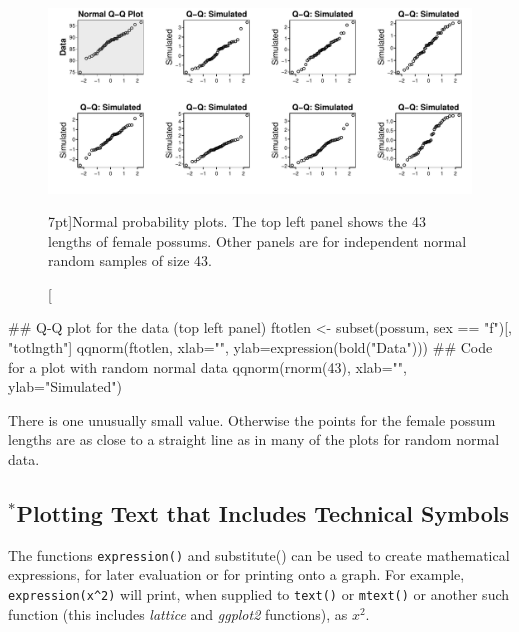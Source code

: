 \documentclass{tufte-book}\usepackage[]{graphicx}\usepackage[]{color}
\newcommand{\txtt}[1]{\texttt{#1}}
\begin{document}
\begin{figure}
\begin{Schunk}


\centerline{\includegraphics[width=\textwidth]{figs/07-possum-qqn-1} }

\end{Schunk}
 \caption[][7pt]{Normal probability plots. The top left panel
   shows the 43 lengths
of female possums. Other panels are for independent normal
random samples of size 43.\label{fig:np-plots}}
\vspace*{-24pt}

\end{figure}

\begin{Schunk}
\begin{Sinput}
## Q-Q plot for the data (top left panel)
ftotlen <- subset(possum, sex == "f")[, "totlngth"]
qqnorm(ftotlen, xlab="",
       ylab=expression(bold("Data")))
## Code for a plot with random normal data
qqnorm(rnorm(43), xlab="", ylab="Simulated")
\end{Sinput}
\end{Schunk}

\noindent There is one unusually small value.  Otherwise the points
for the female possum lengths are as close to a straight line as in
many of the plots for random normal data.

\subsection{$^*$Plotting Text that Includes Technical  Symbols}\label{sec:mathvec}

The functions \txtt{expression()} and {substitute()} can be used
to create mathematical expressions, for later evaluation or for
printing onto a graph.  For example, \verb+expression(x^2)+ will
print, when supplied to \txtt{text()} or \txtt{mtext()} or another
such function (this includes {\em lattice} and {\em ggplot2} functions),
as $x^2$.
\end{document}
